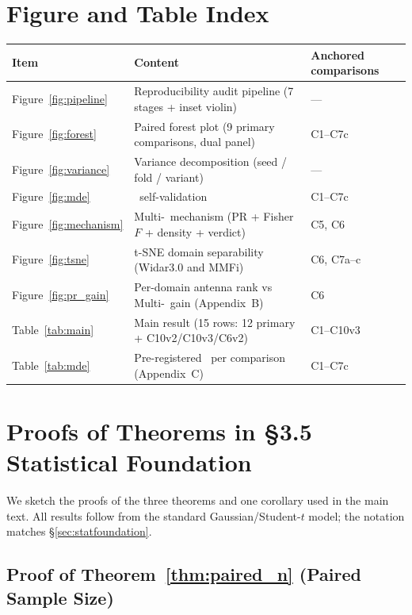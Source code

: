 \documentclass[11pt]{article}
\theoremstyle{definition}
\newcommand{\MDE}{\text{MDE}}
\newcommand{\Rx}{\text{Rx}}
\begin{document}
\appendix
\section{Figure and Table Index}

\begin{table}[!h]
    \centering
    \footnotesize
    \begin{tabular}{@{}l >{\raggedright\arraybackslash}p{7.1cm} l@{}}
    \toprule
    Item & Content & Anchored comparisons \\
    \midrule
    Figure~\ref{fig:pipeline}  & Reproducibility audit pipeline (7 stages + inset violin) & --- \\
    Figure~\ref{fig:forest}    & Paired forest plot (9 primary comparisons, dual panel) & C1--C7c \\
    Figure~\ref{fig:variance}  & Variance decomposition (seed / fold / variant) & --- \\
    Figure~\ref{fig:mde}       & \MDE\ self-validation & C1--C7c \\
    Figure~\ref{fig:mechanism} & Multi-\Rx\ mechanism (PR + Fisher $F$ + density + verdict) & C5, C6 \\
    Figure~\ref{fig:tsne}      & t-SNE domain separability (Widar3.0 and MMFi) & C6, C7a--c \\
    Figure~\ref{fig:pr_gain}   & Per-domain antenna rank vs Multi-\Rx\ gain (Appendix~B) & C6 \\
    Table~\ref{tab:main}       & Main result (15 rows: 12 primary + C10v2/C10v3/C6v2) & C1--C10v3 \\
    Table~\ref{tab:mde}        & Pre-registered \MDE\ per comparison (Appendix~C) & C1--C7c \\
    \bottomrule
    \end{tabular}
\end{table}

\section{Proofs of Theorems in \S3.5 Statistical Foundation}
\label{app:proofs}

We sketch the proofs of the three theorems and one corollary used in the main text. All results follow from the standard Gaussian/Student-$t$ model; the notation matches \S\ref{sec:statfoundation}.

\subsection*{Proof of Theorem~\ref{thm:paired_n} (Paired Sample Size)}
\end{document}
